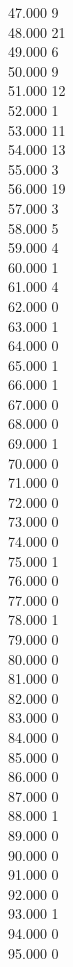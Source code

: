 { 47.000	9 \\
 48.000	21 \\
 49.000	6 \\
 50.000	9 \\
 51.000	12 \\
 52.000	1 \\
 53.000	11 \\
 54.000	13 \\
 55.000	3 \\
 56.000	19 \\
 57.000	3 \\
 58.000	5 \\
 59.000	4 \\
 60.000	1 \\
 61.000	4 \\
 62.000	0 \\
 63.000	1 \\
 64.000	0 \\
 65.000	1 \\
 66.000	1 \\
 67.000	0 \\
 68.000	0 \\
 69.000	1 \\
 70.000	0 \\
 71.000	0 \\
 72.000	0 \\
 73.000	0 \\
 74.000	0 \\
 75.000	1 \\
 76.000	0 \\
 77.000	0 \\
 78.000	1 \\
 79.000	0 \\
 80.000	0 \\
 81.000	0 \\
 82.000	0 \\
 83.000	0 \\
 84.000	0 \\
 85.000	0 \\
 86.000	0 \\
 87.000	0 \\
 88.000	1 \\
 89.000	0 \\
 90.000	0 \\
 91.000	0 \\
 92.000	0 \\
 93.000	1 \\
 94.000	0 \\
 95.000	0 \\
}
